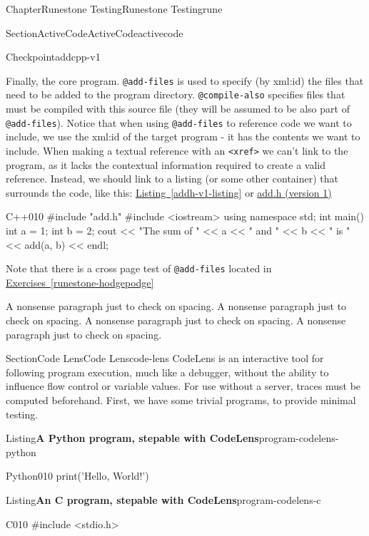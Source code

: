 \documentclass[oneside,10pt,]{book}
\newcommand{\xreffont}{\relax}
\newcommand{\mono}[1]{\texttt{#1}}
\numberwithin{equation}{section}
\begin{document}
\begin{chapterptx}{Chapter}{Runestone Testing}{}{Runestone Testing}{}{}{rune}
\begin{sectionptx}{Section}{ActiveCode}{}{ActiveCode}{}{}{activecode}
\begin{inlineexercise}{Checkpoint}{}{addcpp-v1}
\end{inlineexercise}%
Finally, the core program. \mono{@add-files} is used to specify (by xml:id) the files that need to be added to the program directory. \mono{@compile-also} specifies files that must be compiled with this source file (they will be assumed to be also part of \mono{@add-files}). Notice that when using \mono{@add-files} to reference code we want to include, we use the xml:id of the target program - it has the contents we want to include. When making a textual reference with an \mono{<xref>} we can't link to the program, as it lacks the contextual information required to create a valid reference. Instead, we should link to a listing (or some other container) that surrounds the code, like this: \hyperref[addh-v1-listing]{Listing~{\xreffont\ref{addh-v1-listing}}} or \hyperref[addh-v1-listing]{add.h (version 1)}%
\begin{program}{C++}{0}{1}{0}
#include "add.h"
#include <iostream>
using namespace std;
int main() {
    int a = 1;
    int b = 2;
    cout << "The sum of " << a << " and " << b << " is " << add(a, b) << endl;
}
\end{program}
Note that there is a cross page test of \mono{@add-files} located in \hyperref[runestone-hodgepodge]{Exercises~{\xreffont\ref{runestone-hodgepodge}}}%
\par
A nonsense paragraph just to check on spacing.  A nonsense paragraph just to check on spacing.  A nonsense paragraph just to check on spacing.  A nonsense paragraph just to check on spacing.%
\end{sectionptx}
%
%
\typeout{************************************************}
\typeout{************************************************}
%
\begin{sectionptx}{Section}{Code Lens}{}{Code Lens}{}{}{code-lens}
CodeLens is an interactive tool for following program execution, much like a debugger, without the ability to influence flow control or variable values.  For use without a server, traces must be computed beforehand.  First, we have some trivial programs, to provide minimal testing.%
\begin{listingptx}{Listing}{\textbf{A Python program, stepable with CodeLens}}{program-codelens-python}{}%
\begin{program}{Python}{0}{1}{0}
print('Hello, World!')
\end{program}
\end{listingptx}%
\begin{listingptx}{Listing}{\textbf{An C program, stepable with CodeLens}}{program-codelens-c}{}%
\begin{program}{C}{0}{1}{0}
#include <stdio.h>


\end{program}
\end{listingptx}
\end{sectionptx}
\end{chapterptx}
\end{document}
